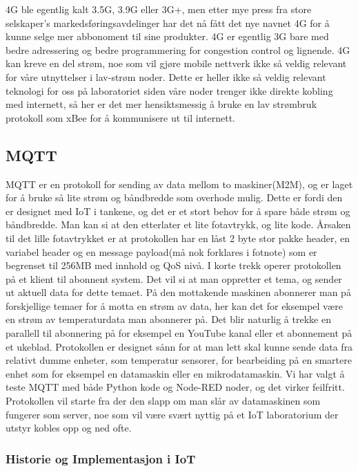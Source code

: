 \documentclass{article}
\begin{document}
4G ble egentlig kalt 3.5G, 3.9G eller 3G+, men etter mye press fra store selskaper's markedsføringsavdelinger har det nå fått det nye navnet 4G for å kunne selge mer abbonoment til sine produkter. 4G er egentlig 3G bare med bedre adressering og bedre programmering for congestion control og lignende. 4G kan kreve en del strøm, noe som vil gjøre mobile nettverk ikke så veldig relevant for våre utnyttelser i lav-strøm noder.
Dette er heller ikke så veldig relevant teknologi for oss på laboratoriet siden våre noder trenger ikke direkte kobling med internett, så her er det mer hensiktsmessig å bruke en lav strømbruk protokoll som xBee for å kommunisere ut til internett.

\subsection{MQTT}
MQTT er en protokoll for sending av data mellom to maskiner(M2M), og er laget for å bruke så lite strøm og båndbredde som overhode mulig. Dette er fordi den er designet med IoT i tankene, og det er et stort behov for å spare både strøm og båndbredde. Man kan si at den etterlater et lite fotavtrykk, og lite kode. Årsaken til det lille fotavtrykket er at protokollen har en låst 2 byte stor pakke header, en variabel header og en message payload(må nok forklares i fotnote) som er begrenset til 256MB med innhold og QoS nivå. I korte trekk operer protokollen på et klient til abonnent system. Det vil si at man oppretter et tema, og sender ut aktuell data for dette temaet. På den mottakende maskinen abonnerer man på forskjellige temaer for å motta en strøm av data, her kan det for eksempel være en strøm av temperaturdata man abonnerer på. Det blir naturlig å trekke en parallell til abonnering på for eksempel en YouTube kanal eller et abonnement på et ukeblad. Protokollen er designet sånn for at man lett skal kunne sende data fra relativt dumme enheter, som temperatur sensorer, for bearbeiding på en smartere enhet som for eksempel en datamaskin eller en mikrodatamaskin. Vi har valgt å teste MQTT med både Python kode og Node-RED noder, og det virker feilfritt. Protokollen vil starte fra der den slapp om man slår av datamaskinen som fungerer som server, noe som vil være svært nyttig på et IoT laboratorium der utstyr kobles opp og ned ofte.

\subsubsection{Historie og Implementasjon i IoT}
\end{document}

